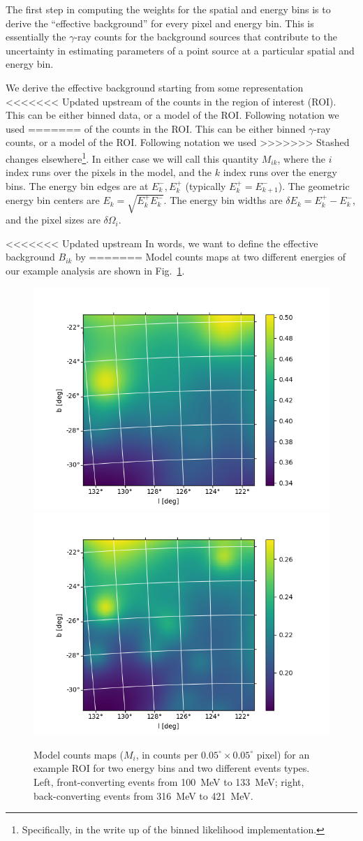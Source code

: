 \documentclass[preprint]{aastex}
\begin{document}
The first step in computing the weights for the spatial and energy bins
is to derive the ``effective background'' for every pixel and energy bin.  
This is essentially the $\gamma$-ray counts for the background sources that
contribute to the uncertainty in estimating parameters of a point source at a
particular spatial and energy bin.

We derive the effective background starting from some representation
<<<<<<< Updated upstream
of the counts in the region of interest (ROI).  This can be either
binned data, or a model of the ROI.  Following notation we used
=======
of the counts in the ROI.  This can be either
binned $\gamma$-ray counts, or a model of the ROI.  Following notation we used
>>>>>>> Stashed changes
elsewhere\footnote{Specifically, in the write up of the binned
  likelihood implementation.}.  In either case we will call this quantity $M_{ik}$, where the $i$
index runs over the pixels in the model, and the $k$ index runs over
the energy bins.  The energy bin edges are at $E_k^-, E_k^+$
(typically $E_k^+ = E_{k+1}^-$).  The geometric energy bin centers are
$E_k = \sqrt{E_k^+ E_k^-}$.  The energy bin widths are $\delta E_k = E_k^+
- E_k^-$, and the pixel sizes are $\delta \Omega_i$.

<<<<<<< Updated upstream
In words, we want to define the effective background $B_{ik}$ by
=======
Model counts maps at two different energies of our example analysis are shown in 
Fig.~\ref{fig:mcube}. 

\begin{figure}[h]  
\begin{centering}
\includegraphics[width=0.49\columnwidth]{figures/mcube_E00_00.png}
\includegraphics[width=0.49\columnwidth]{figures/mcube_E01_04.png}
\vspace{-0.10in}
\caption{\label{fig:mcube}Model counts maps ($M_{i}$, in counts per $0.05^\circ\times0.05^\circ$ pixel)
  for an example ROI for two energy bins and two different events types. Left, front-converting events 
  from 100~MeV to 133~MeV; right, back-converting events from 316~MeV to 421~MeV.}
\end{centering}
\end{figure}
\end{document}
